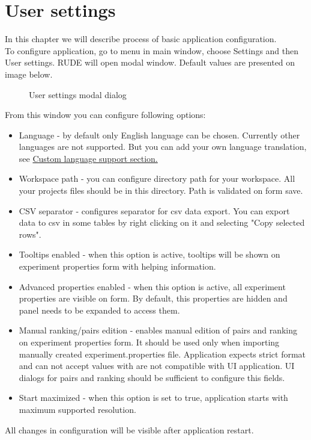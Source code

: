 \section{User settings}\label{section:user-settings}

In this chapter we will describe process of basic application configuration.\\

To configure application, go to menu in main window, choose Settings and then User settings. RUDE will open modal window. Default values are presented on image below.

\begin{figure*}[!ht] 
	\centering
	\caption{User settings modal dialog}
\end{figure*}


From this window you can configure following options:
\begin{itemize}
	\item Language - by default only English language can be chosen. Currently other languages are not supported. But you can add your own language translation, see \hyperref[sub:config-labels]{Custom language support section.}
	\item Workspace path - you can configure directory path for your workspace. All your projects files should be in this directory. Path is validated on form save.
	\item CSV separator - configures separator for csv data export. You can export data to csv in some tables by right clicking on it and selecting "Copy selected rows".
	\item Tooltips enabled - when this option is active, tooltips will be shown on experiment properties form with helping information.
	\item Advanced properties enabled - when this option is active, all experiment properties are visible on form. By default, this properties are hidden and panel needs to be expanded to access them.
	\item Manual ranking/pairs edition - enables manual edition of pairs and ranking on experiment properties form. It should be used only when importing manually created experiment.properties file. Application expects strict format and can not accept values with are not compatible with UI application. UI dialogs for pairs and ranking should be sufficient to configure this fields.
	\item Start maximized - when this option is set to true, application starts with maximum supported resolution.
\end{itemize}

All changes in configuration will be visible after application restart.


\vfill\newpage